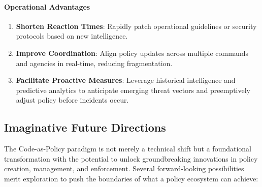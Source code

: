 \documentclass[11pt]{article}
\begin{document}
	\paragraph{Operational Advantages}
	\begin{enumerate}
		\item \textbf{Shorten Reaction Times}: Rapidly patch operational guidelines or security protocols based on new intelligence.
		\item \textbf{Improve Coordination}: Align policy updates across multiple commands and agencies in real-time, reducing fragmentation.
		\item \textbf{Facilitate Proactive Measures}: Leverage historical intelligence and predictive analytics to anticipate emerging threat vectors and preemptively adjust policy before incidents occur.
	\end{enumerate}

	\subsection{Imaginative Future Directions}

	The Code-as-Policy paradigm is not merely a technical shift but a foundational transformation with the potential to unlock groundbreaking innovations in policy creation, management, and enforcement. Several forward-looking possibilities merit exploration to push the boundaries of what a policy ecosystem can achieve:
\end{document}
